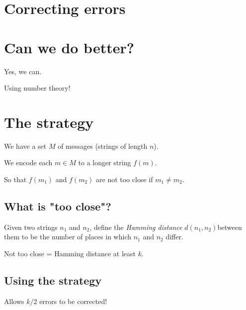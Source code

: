 \documentclass[11pt]{article}
\begin{document}
\href{monkeywords.svg}{}

\begin{center}

\end{center}

\section*{Correcting errors}
\label{sec:orgbe5765b}
\begin{center}

\end{center}

\section*{Can we do better?}
\label{sec:org4766bbc}
Yes, we can.

Using number theory!

\section*{The strategy}
\label{sec:org7af2446}
We have a set \(M\) of messages (strings of length \(n\)).

We encode each \(m \in M\) to a longer string \(f(m)\).

So that \(f(m_1)\) and \(f(m_2)\) are not too close if \(m_1 \neq m_2\).

\subsection*{What is "too close"?}
\label{sec:orgde0bc79}
Given two strings \(n_1\) and \(n_2\), define the \emph{Hamming distance} \(d(n_1,n_2)\)between them to be the number of places in which \(n_1\) and \(n_2\) differ.

Not too close = Hamming distance at least \(k\).

\subsection*{Using the strategy}
\label{sec:org26d8a60}
\begin{center}

\end{center}

Allows \(k/2\) errors to be corrected!
\end{document}

